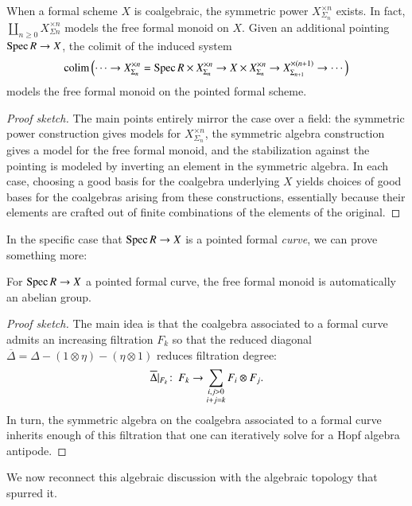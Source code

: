 \begin{corollary}\label{ProofOfFreeFormalMonoids}
When a formal scheme $X$ is coalgebraic, the symmetric power $X^{\times n}_{\Sigma_n}$ exists.  In fact, $\coprod_{n \ge 0} X^{\times n}_{\Sigma n}$ models the free formal monoid on $X$.  Given an additional pointing $\operatorname{Spec} R \to X$, the colimit of the induced system \[\operatorname*{colim} \left(\cdots \to X^{\times n}_{\Sigma_n} = \operatorname{Spec} R \times X^{\times n}_{\Sigma_n} \to X \times X^{\times n}_{\Sigma_n} \to X^{\times(n+1)}_{\Sigma_{n+1}} \to \cdots\right)\] models the free formal monoid on the pointed formal scheme.
\end{corollary}
\begin{proof}[Proof sketch]
The main points entirely mirror the case over a field: the symmetric power construction gives models for $X^{\times n}_{\Sigma_n}$, the symmetric algebra construction gives a model for the free formal monoid, and the stabilization against the pointing is modeled by inverting an element in the symmetric algebra.  In each case, choosing a good basis for the coalgebra underlying $X$ yields choices of good bases for the coalgebras arising from these constructions, essentially because their elements are crafted out of finite combinations of the elements of the original.
\end{proof}

In the specific case that $\operatorname{Spec} R \to X$ is a pointed formal \emph{curve}, we can prove something more:
\begin{corollary}\label{FreeFormalGroupOnACurve}
For $\operatorname{Spec} R \to X$ a pointed formal curve, the free formal monoid is automatically an abelian group.
\end{corollary}
\begin{proof}[Proof sketch]
The main idea is that the coalgebra associated to a formal curve admits an increasing filtration $F_k$ so that the reduced diagonal $\overline \Delta = \Delta - (1 \otimes \eta) - (\eta \otimes 1)$ reduces filtration degree: \[\overline \Delta|_{F_k}\colon\thinspace F_k \to \sum_{\substack{i,j > 0 \\ i+j=k}} F_i \otimes F_j.\]  In turn, the symmetric algebra on the coalgebra associated to a formal curve inherits enough of this filtration that one can iteratively solve for a Hopf algebra antipode.
\end{proof}

We now reconnect this algebraic discussion with the algebraic topology that spurred it.

